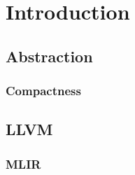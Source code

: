 \chapter{Introduction}\label{ch:introduction}


\section{Abstraction}

\subsection{Compactness}

\section{LLVM}

\subsection{MLIR}